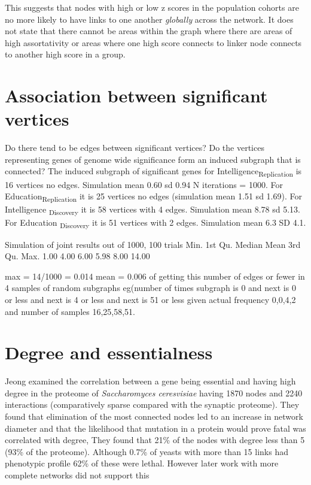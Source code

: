 This suggests that nodes with high or low z scores in the population cohorts are no more likely to have links to one another \textit{globally} across the network. It does not state that there cannot be areas within the graph where there are areas of high assortativity or areas where one high score connects to linker node connects to another high score in a group.

\section{Association between significant vertices}
Do there tend to be edges between significant vertices? Do the vertices representing genes of genome wide significance form an induced subgraph that is connected?
The induced subgraph of significant genes for Intelligence\textsubscript{Replication} is 16 vertices no edges. Simulation mean 0.60 sd 0.94 N iterations = 1000. For Education\textsubscript{Replication} it is 25 vertices no edges (simulation mean 1.51 sd 1.69). For Intelligence \textsubscript{Discovery} it is 58 vertices with 4 edges. Simulation mean 8.78 sd 5.13. For Education \textsubscript{Discovery} it is 51 vertices with 2 edges. Simulation mean 6.3 SD 4.1.

Simulation of joint results out of 1000, 100 trials
Min. 1st Qu.  Median    Mean 3rd Qu.    Max. 
   1.00    4.00    6.00    5.98    8.00   14.00 
   
   max = 14/1000 = 0.014
   mean = 0.006 of getting this number of edges or fewer in 4 samples of random subgraphs eg(number of times subgraph is 0 and next is 0 or less and next is 4 or less and next is 51 or less given actual frequency 0,0,4,2 and number of samples 16,25,58,51.
   
 

\section{Degree and essentialness}
\label{sec:Degree and essentialness}
Jeong \cite{jeong2001lethality} examined the correlation between a gene being essential and having high degree in the proteome of \textit{Saccharomyces ceresvisiae} having 1870 nodes and 2240 interactions (comparatively sparse compared with the synaptic proteome). They found that elimination of the most connected nodes led to an increase in network diameter and that the likelihood that mutation in a protein would prove fatal was correlated with degree, They found that 21\% of the nodes with degree less than 5 (93\% of the proteome). Although 0.7\% of yeasts with more than 15 links had phenotypic profile 62\% of these were lethal. However later work with more complete networks did not support this \cite{milenkovic2011dominating} \cite{yu2008high}


